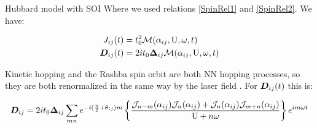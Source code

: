 \begin{section}{Hubbard model with SOI}
Where we used relations \ref{SpinRel1} and \ref{SpinRel2}. We have:

\begin{align}
J_{ij}(t) &= t_0^2\mathcal{M}(\alpha_{ij}, \text{U}, \omega, t) \label{JijHSOI} \\
\boldsymbol{D}_{ij}(t) &= 2it_0\boldsymbol{\Delta}_{ij} \mathcal{M}(\alpha_{ij}, \text{U}, \omega, t) \label{DijHSOI}
\end{align}

Kinetic hopping and the Rashba spin orbit are both NN hopping processes, so they are both renormalized in the same way by the laser field \cite{Stepanov2017}.
For $\boldsymbol{D}_{ij}(t)$ this is:

\begin{equation}
\boldsymbol{D}_{ij} = 2it_0 \boldsymbol{\Delta}_{ij} \sum_{mn}e^{-i(\frac{\pi}{2}+\theta_{ij})m} \left\{ 
    \frac{\mathcal{J}_{n-m}(\alpha_{ij})\mathcal{J}_{n}(\alpha_{ij}) + \mathcal{J}_{n}(\alpha_{ij})\mathcal{J}_{m+n}(\alpha_{ij})}{\text{U}+n\omega} \right\}e^{im\omega t}
\end{equation}

\end{section}



